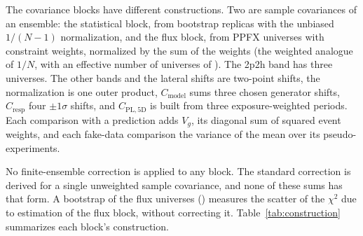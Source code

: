 The covariance blocks have different constructions. Two are sample covariances of an ensemble: the statistical block, from  bootstrap replicas with the unbiased $1/(N-1)$ normalization, and the flux block, from  PPFX universes with constraint weights, normalized by the sum of the weights (the weighted analogue of $1/N$, with an effective number of universes of ). The 2p2h band has three universes. The other bands and the lateral shifts are two-point shifts, the normalization is one outer product, $C_{\mathrm{model}}$ sums three chosen generator shifts, $C_{\mathrm{resp}}$ four $\pm1\sigma$ shifts, and $C_{\mathrm{PL,5D}}$ is built from three exposure-weighted periods. Each comparison with a prediction adds $V_g$, its diagonal sum of squared event weights, and each fake-data comparison the variance of the mean over its pseudo-experiments.

No finite-ensemble correction is applied to any block. The standard correction is derived for a single unweighted sample covariance, and none of these sums has that form. A bootstrap of the flux universes () measures the scatter of the $\chi^2$ due to estimation of the flux block, without correcting it. Table~\ref{tab:construction} summarizes each block's construction.

